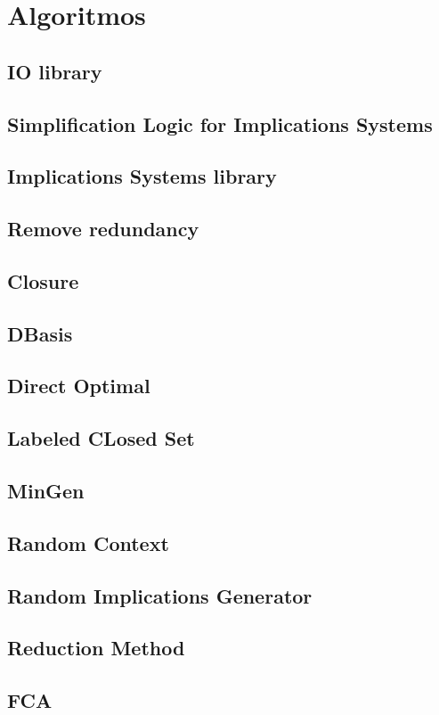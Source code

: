 \section{Algoritmos}
\subsection{IO library}
\subsection{Simplification Logic for Implications Systems}
\subsection{Implications Systems library}
\subsection{Remove redundancy}

 

\subsection{Closure}
\subsection{DBasis}
\subsection{Direct Optimal}
\subsection{Labeled CLosed Set}
\subsection{MinGen}
\subsection{Random Context}
\subsection{Random Implications Generator}
\subsection{Reduction Method}
\subsection{FCA}

\newpage
\thispagestyle{empty}
\mbox{}

\newpage